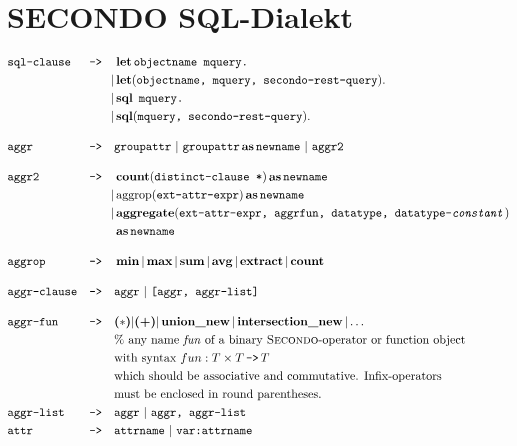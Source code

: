 %
%
%

\chapter{SECONDO SQL-Dialekt}

\begin{align*}
&\texttt{sql-clause} &\texttt{-->}\quad &\op{let} \texttt{objectname mquery.}\\
&&|&\op{let}(\texttt{objectname, mquery, secondo-rest-query}).\\
&&|&\op{sql}\ \texttt{mquery.}\\
&&|&\op{sql}(\texttt{mquery, secondo-rest-query}).\\[1em]
&\texttt{aggr} &\texttt{-->}\quad &\texttt{groupattr}\ |\ \texttt{groupattr} \op{as} \texttt{newname}\ |\ \texttt{aggr2}\\[1em]
&\texttt{aggr2} &\texttt{-->}\quad &\op{count}(\texttt{distinct-clause *}) \op{as} \texttt{newname}\\
&&|&\operatorname{aggrop}(\texttt{ext-attr-expr}) \op{as} \texttt{newname}\\
&&|&\op{aggregate}(\texttt{ext-attr-expr, aggrfun, datatype, datatype-\textit{constant}})\\
&&&\op{as} \texttt{newname}\\[1em]
&\texttt{aggrop} &\texttt{-->}\quad &\op{min}|\op{max}|\op{sum}|\op{avg}|\op{extract}|\op{count}\\[1em]
&\texttt{aggr-clause} &\texttt{-->}\quad &\texttt{aggr}\ |\ \texttt{[aggr, aggr-list]}\\[1em]
&\texttt{aggr-fun} &\texttt{-->}\quad &\textbf{(\begin{math}*\end{math})} |\textbf{(+)}| \op{union\_new}|\op{intersection\_new}|\dots\\
&&&\text{\% any name \textit{fun} of a binary \textsc{Secondo}-operator or function object}\\
&&&\text{with syntax}\ fun:T \times T\operatorname{\texttt{-->}}T\\
&&&\text{which should be associative and commutative. Infix-operators}\\
&&&\text{must be enclosed in round parentheses.}\\
&\texttt{aggr-list} &\texttt{-->}\quad &\texttt{aggr}\ |\ \texttt{aggr, aggr-list}\\
&\texttt{attr} &\texttt{-->}\quad &\texttt{attrname}\ |\ \texttt{var:attrname}
\end{align*}

%
%
%